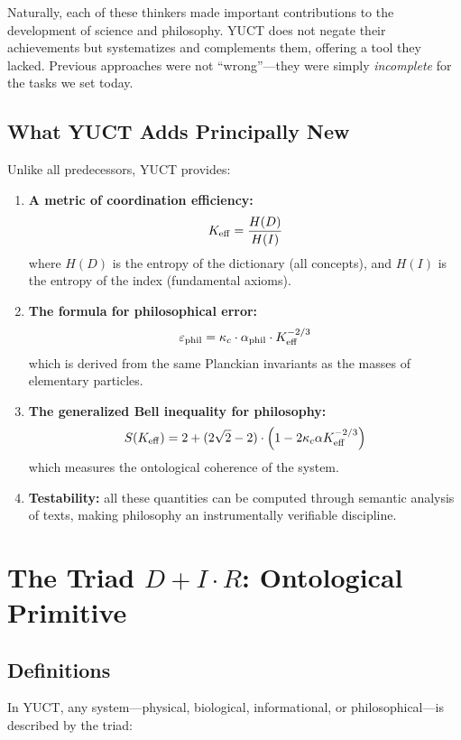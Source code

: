 \documentclass[12pt,a4paper]{article}
\newcommand{\kappac}{\kappa_c}
\newcommand{\eps}{\varepsilon}
\begin{document}
	Naturally, each of these thinkers made important contributions to the development of science and philosophy. YUCT does not negate their achievements but systematizes and complements them, offering a tool they lacked. Previous approaches were not ``wrong''—they were simply \emph{incomplete} for the tasks we set today.
	
	\subsection{What YUCT Adds Principally New}
	
	Unlike all predecessors, YUCT provides:
	
	\begin{enumerate}
		\item \textbf{A metric of coordination efficiency:}
		\[
		\Keff = \frac{H(D)}{H(I)}
		\]
		where \(H(D)\) is the entropy of the dictionary (all concepts), and \(H(I)\) is the entropy of the index (fundamental axioms).
		
		\item \textbf{The formula for philosophical error:}
		\[
		\eps_{\text{phil}} = \kappac \cdot \alpha_{\text{phil}} \cdot \Keff^{-2/3}
		\]
		which is derived from the same Planckian invariants as the masses of elementary particles.
		
		\item \textbf{The generalized Bell inequality for philosophy:}
		\[
		S(\Keff) = 2 + (2\sqrt{2} - 2) \cdot \left(1 - 2\kappac \alpha \Keff^{-2/3}\right)
		\]
		which measures the ontological coherence of the system.
		
		\item \textbf{Testability:} all these quantities can be computed through semantic analysis of texts, making philosophy an instrumentally verifiable discipline.
	\end{enumerate}
	
	\section{The Triad \texorpdfstring{\(D + I \cdot R\)}{D + I * R}: Ontological Primitive}
	
	\subsection{Definitions}
	
	In YUCT, any system—physical, biological, informational, or philosophical—is described by the triad:
	
\end{document}
